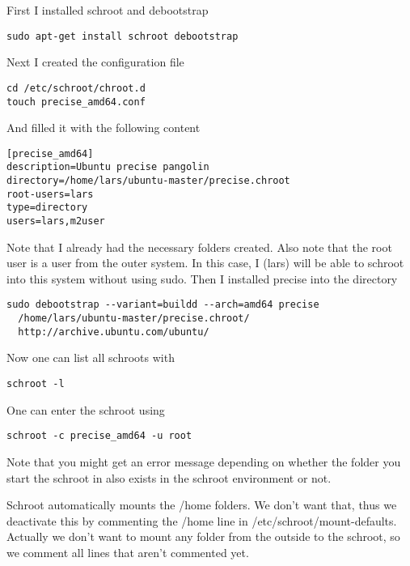 \documentclass[a4paper]{article}
\begin{document}
First I installed schroot and debootstrap

\begin{verbatim}
sudo apt-get install schroot debootstrap
\end{verbatim}

Next I created the configuration file

\begin{verbatim}
cd /etc/schroot/chroot.d
touch precise_amd64.conf
\end{verbatim}

And filled it with the following content

\begin{verbatim}
[precise_amd64]
description=Ubuntu precise pangolin
directory=/home/lars/ubuntu-master/precise.chroot
root-users=lars
type=directory
users=lars,m2user
\end{verbatim}

Note that I already had the necessary folders created.
Also note that the root user is a user from the outer system. In this case, I (lars) will be able to schroot into this system without using sudo.
Then I installed precise into the directory

\begin{verbatim}
sudo debootstrap --variant=buildd --arch=amd64 precise 
  /home/lars/ubuntu-master/precise.chroot/ 
  http://archive.ubuntu.com/ubuntu/
\end{verbatim}

Now one can list all schroots with

\begin{verbatim}
schroot -l
\end{verbatim}

One can enter the schroot using

\begin{verbatim}
schroot -c precise_amd64 -u root
\end{verbatim}

Note that you might get an error message depending on whether the folder you start the schroot in also exists in the schroot environment or not.

Schroot automatically mounts the /home folders. We don't want that, thus we deactivate this by commenting the /home line in /etc/schroot/mount-defaults. Actually we don't want to mount any folder from the outside to the schroot, so we comment all lines that aren't commented yet.
\end{document}
